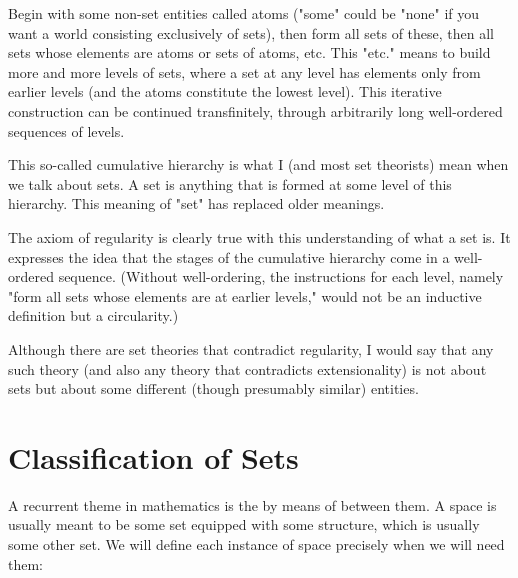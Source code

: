 \documentclass{article}
\begin{document}
\begin{enumerate}
\begin{itemize}
{Begin with some non-set entities called atoms ("some" could be "none" if you want a world consisting exclusively of sets), then form all sets of these, then all sets whose elements are atoms or sets of atoms, etc. This "etc." means to build more and more levels of sets, where a set at any level has elements only from earlier levels (and the atoms constitute the lowest level). This iterative construction can be continued transfinitely, through arbitrarily long well-ordered sequences of levels.

This so-called cumulative hierarchy is what I (and most set theorists) mean when we talk about sets. A set is anything that is formed at some level of this hierarchy. This meaning of "set" has replaced older meanings.

The axiom of regularity is clearly true with this understanding of what a set is. It expresses the idea that the stages of the cumulative hierarchy come in a well-ordered sequence. (Without well-ordering, the instructions for each level, namely "form all sets whose elements are at earlier levels," would not be an inductive definition but a circularity.)

Although there are set theories that contradict regularity, I would say that any such theory (and also any theory that contradicts extensionality) is not about sets but about some different (though presumably similar) entities.}
\end{itemize}
\end{enumerate}


\section{Classification of Sets}\label{sec:set}
A recurrent theme in mathematics is the  by means of  between them. A space is usually meant to be some set equipped with some structure, which is usually some other set. We will define each instance of space precisely when we will need them: 


\end{document}

